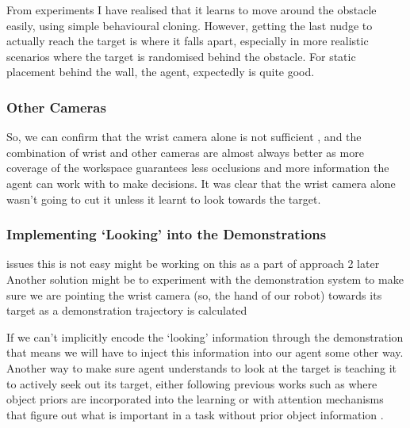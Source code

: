 
From experiments I have realised that it learns to move around the obstacle easily, using simple behavioural cloning. However, getting the last nudge to actually reach the target is where it falls apart, especially in more realistic scenarios where the target is randomised behind the obstacle. For static placement behind the wall, the agent, expectedly is quite good. 

\subsubsection{Other Cameras}
So, we can confirm that the wrist camera alone is not sufficient , and the combination of wrist and other cameras are almost always better as more coverage of the workspace guarantees less occlusions and more information the agent can work with to make decisions. It was clear that the wrist camera alone wasn't going to cut it unless it learnt to look towards the target.



\subsubsection{Implementing `Looking' into the Demonstrations}\label{ew-looking-at-target}
issues this is not easy might be working on this as a part of approach 2 later
Another solution might be to experiment with the demonstration system to make sure we are pointing the wrist camera (so, the hand of our robot) towards its target as a demonstration trajectory is calculated 

If we can't implicitly encode the `looking' information through the demonstration that means we will have to inject this information into our agent some other way. Another way to make sure agent understands to look at the target is teaching it to actively seek out its target, either following previous works such as  where object priors are incorporated into the learning or with attention mechanisms that figure out what is important in a task without prior object information .  

